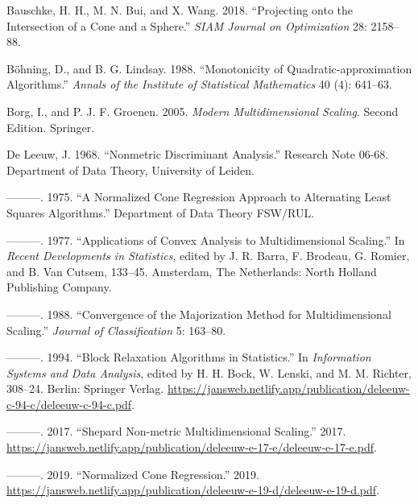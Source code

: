 \documentclass[
  12pt,
]{article}
\newlength{\cslhangindent}
\newenvironment{CSLReferences}[2] %
 {\begin{list}{}{%
  \setlength{\itemindent}{0pt}
  \setlength{\leftmargin}{0pt}
  \setlength{\parsep}{0pt}
  \ifodd #1
   \setlength{\leftmargin}{\cslhangindent}
   \setlength{\itemindent}{-1\cslhangindent}
  \fi
  \setlength{\itemsep}{#2\baselineskip}}}
 {\end{list}}
\begin{document}
\label{refs}
\begin{CSLReferences}{1}{0}
Bauschke, H. H., M. N. Bui, and X. Wang. 2018. {``{Projecting onto the Intersection of a Cone and a Sphere}.''} \emph{SIAM Journal on Optimization} 28: 2158--88.

Böhning, D., and B. G. Lindsay. 1988. {``{Monotonicity of Quadratic-approximation Algorithms}.''} \emph{Annals of the Institute of Statistical Mathematics} 40 (4): 641--63.

Borg, I., and P. J. F. Groenen. 2005. \emph{Modern Multidimensional Scaling}. Second Edition. Springer.

De Leeuw, J. 1968. {``Nonmetric Discriminant Analysis.''} Research Note 06-68. Department of Data Theory, University of Leiden.

---------. 1975. {``{A Normalized Cone Regression Approach to Alternating Least Squares Algorithms}.''} Department of Data Theory FSW/RUL.

---------. 1977. {``Applications of Convex Analysis to Multidimensional Scaling.''} In \emph{Recent Developments in Statistics}, edited by J. R. Barra, F. Brodeau, G. Romier, and B. Van Cutsem, 133--45. Amsterdam, The Netherlands: North Holland Publishing Company.

---------. 1988. {``Convergence of the Majorization Method for Multidimensional Scaling.''} \emph{Journal of Classification} 5: 163--80.

---------. 1994. {``{Block Relaxation Algorithms in Statistics}.''} In \emph{Information Systems and Data Analysis}, edited by H. H. Bock, W. Lenski, and M. M. Richter, 308--24. Berlin: Springer Verlag. \url{https://jansweb.netlify.app/publication/deleeuw-c-94-c/deleeuw-c-94-c.pdf}.

---------. 2017. {``{Shepard Non-metric Multidimensional Scaling}.''} 2017. \url{https://jansweb.netlify.app/publication/deleeuw-e-17-e/deleeuw-e-17-e.pdf}.

---------. 2019. {``Normalized Cone Regression.''} 2019. \url{https://jansweb.netlify.app/publication/deleeuw-e-19-d/deleeuw-e-19-d.pdf}.


\end{CSLReferences}
\end{document}

